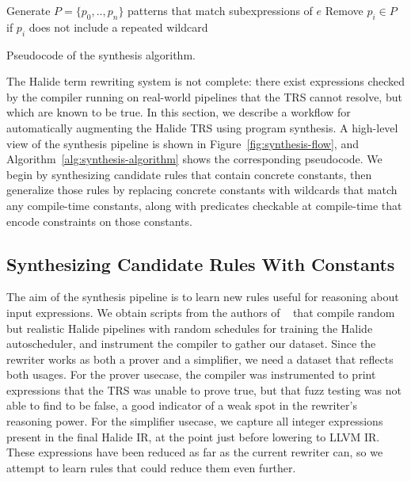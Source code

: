 \documentclass[acmsmall,review,anonymous]{acmart}\settopmatter{printfolios=true,printccs=false,printacmref=false}
\begin{document}
\begin{algorithm}[htbp]
  \SetAlgoLined
  \BlankLine
  Generate $P=\{p_0,..,p_n\}$ patterns that match subexpressions of $e$\;
  Remove $p_i \in P$ if $p_i$ does not include a repeated wildcard\;
  \caption{\label{alg:synthesis-algorithm} Pseudocode of the synthesis algorithm.}
\end{algorithm}

The Halide term rewriting system is not complete: there
exist expressions checked by the compiler running on real-world pipelines that
the TRS cannot resolve, but which are known to be true. 
In this section, we describe a workflow for automatically augmenting the Halide
TRS using program synthesis.
A high-level view of the synthesis pipeline is shown in Figure~\ref{fig:synthesis-flow},
and Algorithm~\ref{alg:synthesis-algorithm} shows the corresponding pseudocode.
We begin by synthesizing candidate rules that contain concrete constants,
then generalize those rules by replacing concrete constants with wildcards that
match any compile-time constants, along with predicates checkable at compile-time
that encode constraints on those constants.

\subsection{Synthesizing Candidate Rules With Constants}
The aim of the synthesis pipeline is to learn new rules useful for reasoning about input expressions.
We obtain scripts from the authors of \citeauthor{Adams2019}~\cite{Adams2019} that compile
 random but realistic Halide pipelines with random schedules for
training the Halide autoscheduler, and instrument the compiler to gather our dataset.
Since the rewriter works as both a prover and a simplifier, we need a dataset that reflects both usages.
For the prover usecase,  the compiler was instrumented to print
expressions that the TRS was unable to prove true, but that fuzz
testing was not able to find to be false, a good indicator of a weak spot in the
rewriter's reasoning power. For the simplifier usecase, we capture all
integer expressions present in the final Halide IR, at the point just before 
lowering to LLVM IR. These expressions have been reduced as far as the current rewriter can, so we attempt
to learn rules that could reduce them even further. 
\end{document}
